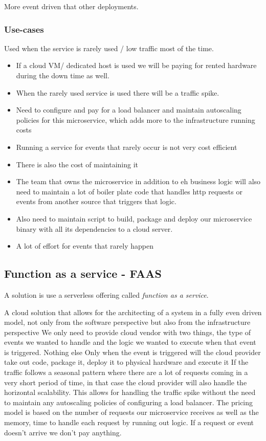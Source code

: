 More event driven that other deployments.

\subsubsection{Use-cases}
Used when the service is rarely used / low traffic most of the time.
\begin{itemize}
    \item If a cloud VM/ dedicated host is used we will be paying for rented hardware during the down time as well.
    \item When the rarely used service is used there will be a traffic spike.
    \item Need to configure and pay for a load balancer and maintain autoscaling policies for this microservice, which adds more to the infrastructure running costs
    \item Running a service for events that rarely occur is not very cost efficient
    \item There is also the cost of maintaining it
    \item The team that owns the microservice in addition to eh business logic will also need to maintain a lot of boiler plate code that handles http requests or events from another source that triggers that logic.
    \item Also need to maintain script to build, package and deploy our microservice binary with all its dependencies to a cloud server.
    \item A lot of effort for events that rarely happen
\end{itemize}

\subsection{Function as a service - FAAS}
A solution is use a serverless offering called \textit{function as a service}.

A cloud solution that allows for the architecting of a system in a fully even driven model, not only from the software perspective but also from the infrastructure perspective
We only need to provide cloud vendor with two things, the type of events we wanted to handle and the logic we wanted to execute when that event is triggered.
Nothing else
Only when the event is triggered will the cloud provider take out code, package it, deploy it to physical hardware and execute it
If the traffic follows a seasonal pattern where there are a lot of requests coming in a very short period of time, in that case the cloud provider will also handle the horizontal scalability.
This allows for handling the traffic spike without the need to maintain any autoscaling policies of configuring a load balancer.
The pricing model is based on the number of requests our microservice receives as well as the memory, time to handle each request by running out logic.
If a request or event doesn't arrive we don't pay anything.

